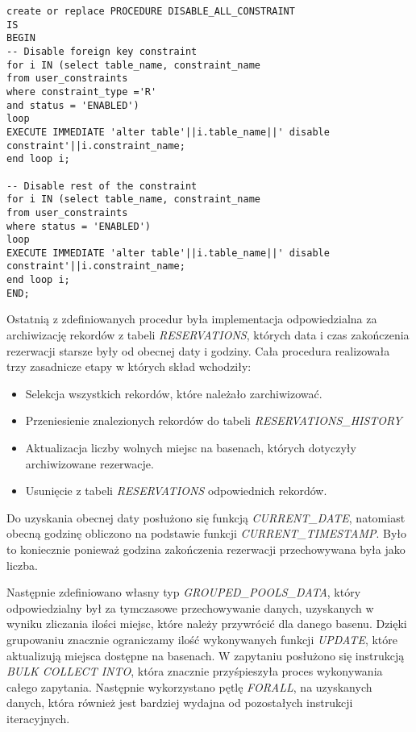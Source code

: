 \documentclass[a4paper]{article}
\begin{document}
\newpage

\begin{verbatim}
create or replace PROCEDURE DISABLE_ALL_CONSTRAINT
IS
BEGIN
-- Disable foreign key constraint
for i IN (select table_name, constraint_name
from user_constraints
where constraint_type ='R'
and status = 'ENABLED')
loop
EXECUTE IMMEDIATE 'alter table'||i.table_name||' disable constraint'||i.constraint_name;
end loop i;

-- Disable rest of the constraint
for i IN (select table_name, constraint_name
from user_constraints
where status = 'ENABLED')
loop
EXECUTE IMMEDIATE 'alter table'||i.table_name||' disable constraint'||i.constraint_name;
end loop i;
END;

\end{verbatim}

Ostatnią z zdefiniowanych procedur była implementacja odpowiedzialna za archiwizację rekordów z tabeli \textit{RESERVATIONS}, których data i czas zakończenia rezerwacji starsze były od obecnej daty i godziny.  Cała procedura realizowała trzy zasadnicze etapy w których skład wchodziły:
\begin{itemize}
    \item Selekcja wszystkich rekordów, które należało zarchiwizować.
    \item Przeniesienie znalezionych rekordów do tabeli \textit{RESERVATIONS\_HISTORY}
    \item Aktualizacja liczby wolnych miejsc na basenach, których dotyczyły archiwizowane rezerwacje.
    \item Usunięcie z tabeli \textit{RESERVATIONS} odpowiednich rekordów.
\end{itemize}

Do uzyskania obecnej daty posłużono się funkcją \textit{CURRENT\_DATE}, natomiast obecną godzinę obliczono na podstawie funkcji \textit{CURRENT\_TIMESTAMP}. Było to koniecznie ponieważ godzina zakończenia rezerwacji przechowywana była jako liczba.

Następnie zdefiniowano własny typ \textit{ GROUPED\_POOLS\_DATA}, który odpowiedzialny był za tymczasowe przechowywanie danych, uzyskanych w wyniku zliczania ilości miejsc, które należy przywrócić dla danego basenu. Dzięki grupowaniu znacznie ograniczamy ilość wykonywanych funkcji \textit{UPDATE}, które aktualizują miejsca dostępne na basenach. W zapytaniu posłużono się instrukcją \textit{BULK COLLECT INTO}, która znacznie przyśpieszyła proces wykonywania całego zapytania. Następnie wykorzystano pętlę \textit{FORALL}, na uzyskanych danych, która również jest bardziej wydajna od pozostałych instrukcji iteracyjnych.
\end{document}
